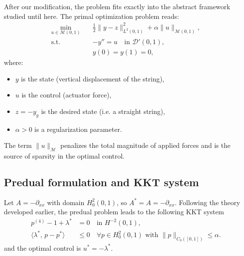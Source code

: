 \documentclass[11pt,a4paper]{article}
\begin{document}
After our modification, the problem fits exactly into the abstract framework studied until here.
The primal optimization problem reads:
\begin{equation}
\boxed{
\begin{aligned}
\min_{u \in \mathcal M(0,1)} \quad &
\frac12 \| y - z \|_{L^2(0,1)}^2
+ \alpha \|u\|_{\mathcal M(0,1)} ,\\
\text{s.t.} \quad &
- y'' = u \quad \text{in } \mathcal D'(0,1),\\
& y(0)=y(1)=0,
\end{aligned}
}
\label{eq:primal-problem}
\end{equation}
where:
\begin{itemize}
\item $y$ is the state (vertical displacement of the string),
\item $u$ is the control (actuator force),
\item $z=-y_g$ is the desired state (i.e. a straight string),
\item $\alpha>0$ is a regularization parameter.
\end{itemize}

The term $\|u\|_{\mathcal M}$ penalizes the total magnitude of applied forces and
is the source of sparsity in the optimal control.


\subsection*{Predual formulation and KKT system}

Let $A=-\partial_{xx}$ with domain $H_0^2(0,1)$, so $A^* = A = -\partial_{xx}$.
Following the theory developed earlier, the predual problem leads to the
following KKT system 
\begin{align}
p^{(4)} - 1 + \lambda^* &= 0
\quad \text{in } H^{-2}(0,1),
\label{eq:kkt-reduced} \\
\langle \lambda^*,\, p - p^* \rangle &\le 0
\quad \forall p\in H_0^2(0,1)
\text{ with } \|p\|_{C_0([0,1])}\le \alpha.
\label{eq:kkt-reduced-2}
\end{align}
and the optimal control is $u^* = -\lambda^*$.

\end{document}
